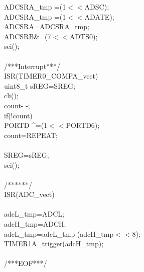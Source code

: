 \documentclass[titlepage, a4paper, 10pt, reqno, openany]{report}
\begin{document}
\begin{minipage}[t]{.3\linewidth}
\hspace*{.5cm}	ADCSRA\_tmp \textbar =(1$<<$ADSC); \\
\hspace*{.5cm}	ADCSRA\_tmp \textbar =(1$<<$ADATE); \\
\hspace*{.5cm}	ADCSRA=ADCSRA\_tmp; \\
\hspace*{.5cm}	ADCSRB\&=\texttildelow (7$<<$ADTS0); \\
\hspace*{.5cm}	sei(); \\
\textbraceright \\
/***Interrupt***/ \\
ISR(TIMER0\_COMPA\_vect)\textbraceleft \\
\hspace*{.5cm}	uint8\_t sREG=SREG; \\
\hspace*{.5cm}	cli(); \\
\hspace*{.5cm}	count- -; \\
\hspace*{.5cm}	if(!count)\textbraceleft \\
\hspace*{1cm}		PORTD \textasciicircum =(1$<<$PORTD6); \\
\hspace*{1cm}		count=REPEAT; \\
\hspace*{.5cm}	\textbraceright \\
\hspace*{.5cm}	SREG=sREG; \\
\hspace*{.5cm}	sei(); \\
\textbraceright \\
/******/ \\
ISR(ADC\_vect) \\
\textbraceleft \\
\hspace*{.5cm}	adcL\_tmp=ADCL; \\
\hspace*{.5cm}	adcH\_tmp=ADCH; \\
\hspace*{.5cm}	adcL\_tmp=adcL\_tmp \textbar (adcH\_tmp$<<$8); \\
\hspace*{.5cm}	TIMER1A\_trigger(adcH\_tmp); \\
\textbraceright \\
/***EOF***/
\end{minipage} \par
\end{document}
